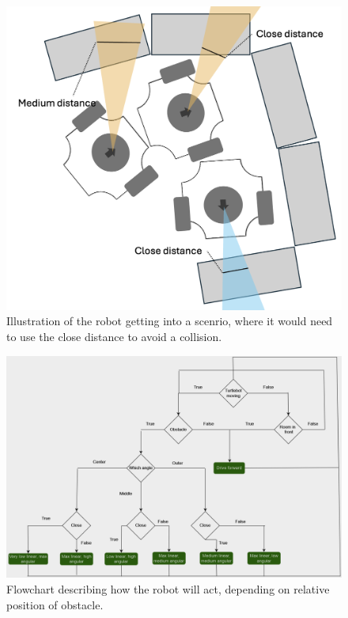 \documentclass[conference]{IEEEtran}
\begin{document}
\begin{figure}[htbp]
    \centerline{\includegraphics[width=1.0\columnwidth]{Pictures/Close Distance Avoidance.png}}
    \caption{Illustration of the robot getting into a scenrio, where it would need to use the close distance to avoid a collision.}
    \label{sec:close aviodance}
    \end{figure}
\begin{figure}[b]
    \centerline{\includegraphics[width=1.0\columnwidth]{Pictures/Flowchart.png}}
    \caption{Flowchart describing how the robot will act, depending on relative position of obstacle.}
    \label{sec:flowchart}
    \end{figure}
\end{document}
